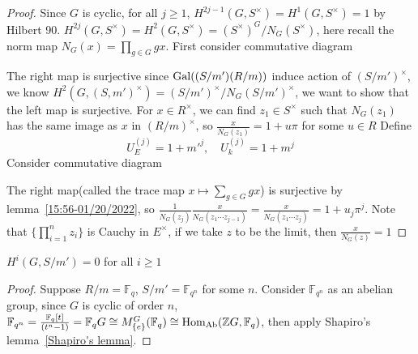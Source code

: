\documentclass[a4paper,10pt]{article}
\begin{document}
\begin{proof}
Since $G$ is cyclic, for all $j\geq1$, $H^{2j-1}(G,S^\times)=H^1(G,S^\times)=1$ by Hilbert 90. $H^{2j}(G,S^\times)=H^{2}(G,S^\times)=(S^\times)^G/N_G(S^\times)$, here recall the norm map $N_G(x)=\prod_{g\in G}gx$. First consider commutative diagram
\begin{center}
\end{center}
The right map is surjective since $\operatorname{Gal}((S/m')(R/m))$ induce action of $(S/m')^\times$, we know $H^2(G,(S,m')^\times)=(S/m')^\times/N_G(S/m')^\times$, we want to show that the left map is surjective. For $x\in R^\times$, we can find $z_1\in S^\times$ such that $N_G(z_1)$ has the same image as $x$ in $(R/m)^\times$, so $\frac{x}{N_G(z_1)}=1+u\pi$ for some $u\in R$
Define
\[
U_E^{(j)}=1+m'^j,\quad U_k^{(j)}=1+m^j
\]
Consider commutative diagram
\begin{center}
\end{center}
The right map(called the trace map $x\mapsto \sum_{g\in G}gx$) is surjective by lemma~\ref{15:56-01/20/2022}, so $\frac{1}{N_G(z_j)}\frac{x}{N_G(z_1\cdots z_{j-1})}=\frac{x}{N_G(z_1\cdots z_j)}=1+u_j\pi^j$. Note that $\{\prod_{i=1}^nz_i\}$ is Cauchy in $E^\times$, if we take $z$ to be the limit, then $\frac{x}{N_G(z)}=1$
\end{proof}

\begin{lemma}\label{15:56-01/20/2022}
$H^i(G,S/m')=0$ for all $i\geq1$
\end{lemma}

\begin{proof}
Suppose $R/m=\mathbb F_q$, $S/m'=\mathbb F_{q^n}$ for some $n$. Consider $\mathbb F_{q^n}$ as an abelian group, since $G$ is cyclic of order $n$, $\mathbb F_{q^n}=\frac{\mathbb F_q[t]}{(t^n-1)}=\mathbb F_qG\cong M^G_{\{e\}}(\mathbb F_q)\cong\operatorname{Hom}_{\text{Ab}}(\mathbb ZG,\mathbb F_q)$, then apply Shapiro's lemma~\ref{Shapiro's lemma}.
\end{proof}
\end{document}
